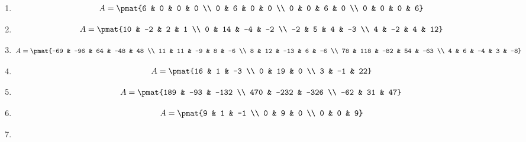 \begin{enumerate}
\item

\begin{align*}
A = \pmat{6 & 0 & 0 & 0 \\ 0 & 6 & 0 & 0 \\ 0 & 0 & 6 & 0 \\ 0 & 0 & 0 & 6}
\end{align*}

\item

\begin{align*}
A = \pmat{10 & -2 & 2 & 1 \\ 0 & 14 & -4 & -2 \\ -2 & 5 & 4 & -3 \\ 4 & -2 & 4 & 12}
\end{align*}

\item

\begin{align*}
A = \pmat{-69 & -96 & 64 & -48 & 48 \\ 11 & 11 & -9 & 8 & -6 \\ 8 & 12 & -13 & 6 & -6 \\ 78 & 118 & -82 & 54 & -63 \\ 4 & 6 & -4 & 3 & -8}
\end{align*}

\item

\begin{align*}
A = \pmat{16 & 1 & -3 \\ 0 & 19 & 0 \\ 3 & -1 & 22}
\end{align*}

\item

\begin{align*}
A = \pmat{189 & -93 & -132 \\ 470 & -232 & -326 \\ -62 & 31 & 47}
\end{align*}

\item

\begin{align*}
A = \pmat{9 & 1 & -1 \\ 0 & 9 & 0 \\ 0 & 0 & 9}
\end{align*}

\item


\end{enumerate}

